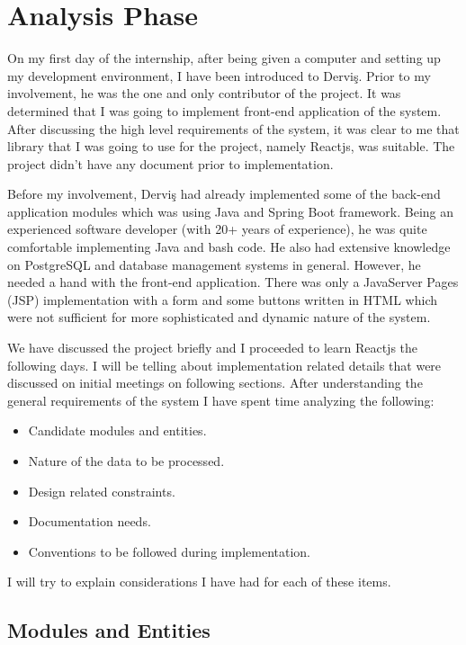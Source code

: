 \section{Analysis Phase}
On my first day of the internship, after being given a computer and setting up 
my development environment, I have been introduced to Derviş. Prior to my 
involvement, he was the one and only contributor of the project. It was 
determined that I was going to implement front-end application of the system. 
After discussing the high level requirements of the system, it was clear to me 
that library that I was going to use for the project, namely Reactjs, was 
suitable. The project didn't have any document prior to implementation.
\par
Before my involvement, Derviş had already implemented some of the back-end 
application modules which was using Java and Spring Boot framework. Being an 
experienced software developer (with 20+ years of experience), he was quite 
comfortable implementing Java and bash code. He also had extensive knowledge 
on PostgreSQL and database management systems in general. However, he needed 
a hand with the front-end application. There was only a JavaServer Pages (JSP) 
implementation with a form and some buttons written in HTML which were not 
sufficient for more sophisticated and dynamic nature of the system.
\par
We have discussed the project briefly and I proceeded to learn Reactjs the 
following days. I will be telling about implementation related details that 
were discussed on initial meetings on following sections. After understanding 
the general requirements of the system I have spent time analyzing the 
following:
\begin{itemize}
    \item Candidate modules and entities.
    \item Nature of the data to be processed.
    \item Design related constraints.
    \item Documentation needs.
    \item Conventions to be followed during implementation.
\end{itemize}

I will try to explain considerations I have had for each of these items. 

\subsection{Modules and Entities}

